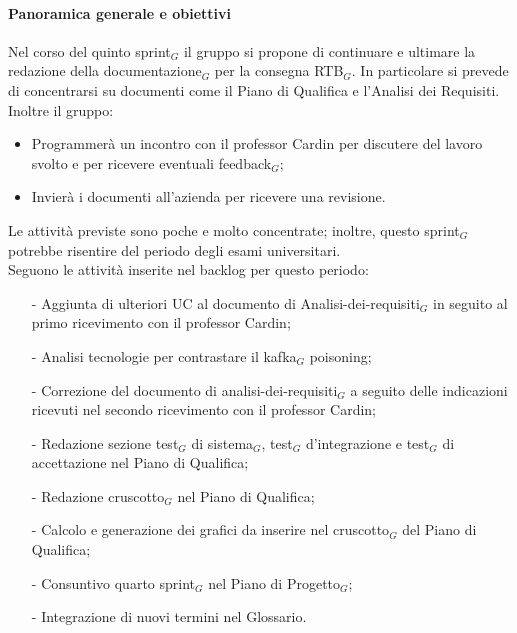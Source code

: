 \documentclass[10pt]{article}
\begin{document}
{{{{{{    \paragraph{Panoramica generale e obiettivi}\mbox{}\vspace{0.4em}

Nel corso del quinto sprint$_G$ il gruppo si propone di continuare e ultimare la redazione della documentazione$_G$ per la consegna RTB$_G$.
    In particolare si prevede di concentrarsi su documenti come il Piano di Qualifica e l'Analisi dei Requisiti.\\
    Inoltre il gruppo:
    \begin{itemize}
        \item Programmerà un incontro con il professor Cardin per discutere del lavoro svolto e per ricevere eventuali feedback$_G$;
        \item Invierà i documenti all'azienda per ricevere una revisione.
    \end{itemize}
    Le attività previste sono poche e molto concentrate; inoltre, questo sprint$_G$ potrebbe risentire del periodo degli esami universitari.\\

    Seguono le attività inserite nel backlog per questo periodo:
    \vspace{-0.5em}
    \begin{itemize}
    \setlength\itemsep{-0.2em}
    \item [-] Aggiunta di ulteriori UC al documento di Analisi-dei-requisiti$_G$ in seguito al primo ricevimento con il professor Cardin;
    \item [-] Analisi tecnologie per contrastare il kafka$_G$ poisoning;
    \item [-] Correzione del documento di analisi-dei-requisiti$_G$ a seguito delle indicazioni ricevuti nel secondo ricevimento con il professor Cardin;
    \item [-] Redazione sezione test$_G$ di sistema$_G$, test$_G$ d'integrazione e test$_G$ di accettazione nel Piano di Qualifica;
    \item [-] Redazione cruscotto$_G$ nel Piano di Qualifica;
    \item [-] Calcolo e generazione dei grafici da inserire nel cruscotto$_G$ del Piano di Qualifica;
    \item [-] Consuntivo quarto sprint$_G$ nel Piano di Progetto$_G$;
    \item [-] Integrazione di nuovi termini nel Glossario.
    \end{itemize}

}}}}}}
\end{document}
